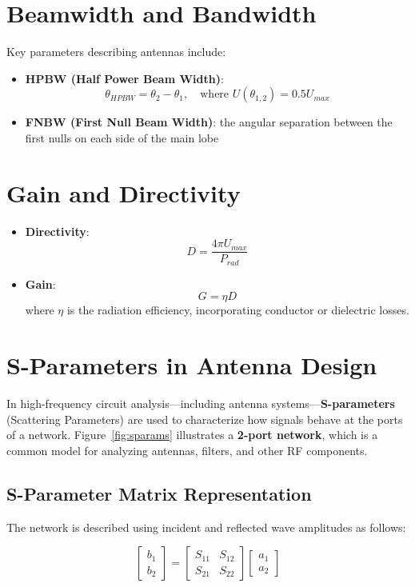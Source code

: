 \section{Beamwidth and Bandwidth}

Key parameters describing antennas include:
\begin{itemize}
    \item \textbf{HPBW (Half Power Beam Width)}:
    \[
    \theta_{HPBW} = \theta_2 - \theta_1, \quad \text{where } U(\theta_{1,2}) = 0.5 U_{max}
    \]
    \item \textbf{FNBW (First Null Beam Width)}: the angular separation between the first nulls on each side of the main lobe
\end{itemize}

\section{Gain and Directivity}

\begin{itemize}
    \item \textbf{Directivity}:
    \[
    D = \frac{4\pi U_{max}}{P_{rad}}
    \]
    \item \textbf{Gain}:
    \[
    G = \eta D
    \]
    where $\eta$ is the radiation efficiency, incorporating conductor or dielectric losses.
\end{itemize}
\section{S-Parameters in Antenna Design}

In high-frequency circuit analysis—including antenna systems—\textbf{S-parameters} (Scattering Parameters) are used to characterize how signals behave at the ports of a network. Figure~\ref{fig:sparams} illustrates a \textbf{2-port network}, which is a common model for analyzing antennas, filters, and other RF components.

\subsection*{S-Parameter Matrix Representation}

The network is described using incident and reflected wave amplitudes as follows:

\[
\begin{bmatrix}
b_1 \\
b_2
\end{bmatrix}
=
\begin{bmatrix}
S_{11} & S_{12} \\
S_{21} & S_{22}
\end{bmatrix}
\begin{bmatrix}
a_1 \\
a_2
\end{bmatrix}
\]

